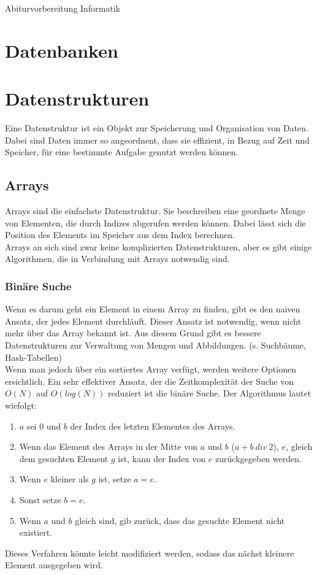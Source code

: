 \documentclass{article}
\begin{document}
\begin{titlepage}
    \begin{center}
        \Huge Abiturvorbereitung Informatik
    \end{center}
\end{titlepage}
\tableofcontents
\pagebreak
\section{Datenbanken}
\section{Datenstrukturen}
Eine Datenstruktur ist ein Objekt zur Speicherung und Organisation von Daten. Dabei sind Daten immer so angeordnent, dass sie effizient, in Bezug auf Zeit und Speicher, für eine bestimmte Aufgabe genutzt werden können.
\subsection{Arrays}
Arrays sind die einfachste Datenstruktur. Sie beschreiben eine geordnete Menge von Elementen, die durch Indizes abgerufen werden können. Dabei lässt sich die Position des Elements im Speicher aus dem Index berechnen.\\
Arrays an sich sind zwar keine komplizierten Datenstrukturen, aber es gibt einige Algorithmen, die in Verbindung mit Arrays notwendig sind.
\subsubsection{Binäre Suche}
Wenn es darum geht ein Element in einem Array zu finden, gibt es den naiven Ansatz, der jedes Element durchläuft. Dieser Ansatz ist notwendig, wenn nicht mehr über das Array bekannt ist. Aus diesem Grund gibt es bessere Datenstrukturen zur Verwaltung von Mengen und Abbildungen. (s. Suchbäume, Hash-Tabellen)\\
Wenn man jedoch über ein sortiertes Array verfügt, werden weitere Optionen ersichtlich. Ein sehr effektiver Ansatz, der die Zeitkomplexität der Suche von $O(N)$ auf $O(log(N))$ reduziert ist die binäre Suche. Der Algorithmus lautet wiefolgt:
\begin{enumerate}
    \item $a$ sei $0$ und $b$ der Index des letzten Elementes des Arrays.
    \item Wenn das Element des Arrays in der Mitte von $a$ und $b$ ($a + b\: div\: 2$), $e$, gleich dem gesuchten Element $g$ ist, kann der Index von $e$ zurückgegeben werden.
    \item Wenn $e$ kleiner als $g$ ist, setze $a=e$.
    \item Sonst setze $b=e$.
    \item Wenn $a$ und $b$ gleich sind, gib zurück, dass das gesuchte Element nicht existiert.
\end{enumerate}
Dieses Verfahren könnte leicht modifiziert werden, sodass das nächst kleinere Element ausgegeben wird.
\end{document}
